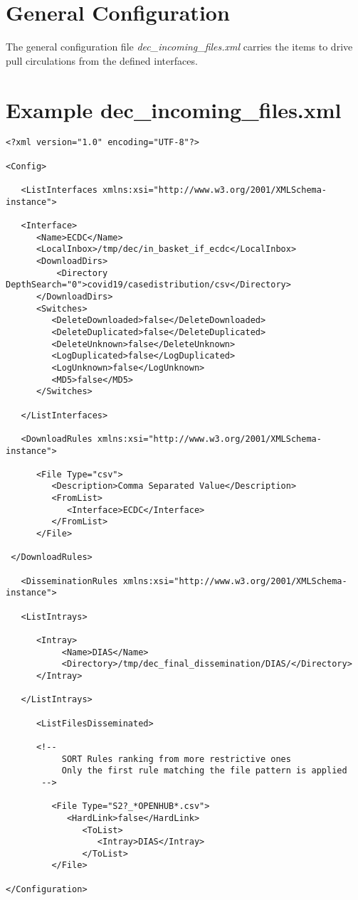 \documentclass[dec_sum_main.tex]{subfiles}
\begin{document}
\section{General Configuration}
 
\par
\noindent
The general configuration file \textit{dec\_incoming\_files.xml} carries the items to drive pull circulations from the defined interfaces.


\label{decincomingfilesxml}
\section{Example dec\_incoming\_files.xml}
\begin{verbatim}
<?xml version="1.0" encoding="UTF-8"?>

<Config>

   <ListInterfaces xmlns:xsi="http://www.w3.org/2001/XMLSchema-instance">

   <Interface>
      <Name>ECDC</Name>
      <LocalInbox>/tmp/dec/in_basket_if_ecdc</LocalInbox>
      <DownloadDirs>
          <Directory DepthSearch="0">covid19/casedistribution/csv</Directory>
      </DownloadDirs>
      <Switches>
         <DeleteDownloaded>false</DeleteDownloaded>
         <DeleteDuplicated>false</DeleteDuplicated>
         <DeleteUnknown>false</DeleteUnknown>
         <LogDuplicated>false</LogDuplicated>
         <LogUnknown>false</LogUnknown>
         <MD5>false</MD5>
      </Switches>
   
   </ListInterfaces>

   <DownloadRules xmlns:xsi="http://www.w3.org/2001/XMLSchema-instance">

      <File Type="csv">
         <Description>Comma Separated Value</Description>
         <FromList>
            <Interface>ECDC</Interface>
         </FromList>
      </File>

 </DownloadRules>

   <DisseminationRules xmlns:xsi="http://www.w3.org/2001/XMLSchema-instance">

   <ListIntrays>

      <Intray>
		   <Name>DIAS</Name>
           <Directory>/tmp/dec_final_dissemination/DIAS/</Directory>
      </Intray>

   </ListIntrays>

      <ListFilesDisseminated>

	  <!--
           SORT Rules ranking from more restrictive ones    
           Only the first rule matching the file pattern is applied     
       -->

         <File Type="S2?_*OPENHUB*.csv">
            <HardLink>false</HardLink>
               <ToList>
                  <Intray>DIAS</Intray>
               </ToList>
         </File>

</Configuration>

\end{verbatim}
\end{document}
